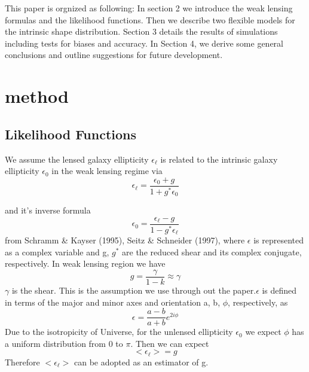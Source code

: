 \documentclass[useAMS,usenatbib]{mn2e}
\begin{document}
This paper is orgnized as following: In section 2 we introduce the
weak lensing formulas and the likelihood functions. Then we describe
two flexible models for the intrinsic shape distribution. Section 3 details
the results of simulations including tests for biases and accuracy. In Section 4, we
derive some general conclusions and outline suggestions for future
development.




\section{method}

\label{sec:XXX}


\subsection{Likelihood Functions}

We assume the lensed galaxy ellipticity $\epsilon_{\ell}$ is related
to the intrinsic galaxy ellipticity $\epsilon_{0}$ in the weak lensing
regime via 
\begin{equation}
\epsilon_{\ell}=\frac{\epsilon_{0}+g}{1+g^{*}\epsilon_{0}}
\end{equation}


and it's inverse formula 
\begin{equation}
\epsilon_{0}=\frac{\epsilon_{\ell}-g}{1-g^{*}\epsilon_{\ell}}
\end{equation}
from Schramm \& Kayser (1995), Seitz \& Schneider (1997), where $\epsilon$
is represented as a complex variable and g, $g^{*}$ are the reduced
shear and its complex conjugate, respectively. In weak lensing region we have 
\begin{equation}
g=\frac{\gamma}{1-k}\approx\gamma
\end{equation}
$\gamma$ is the shear. This is the assumption we use through out
the paper.$\epsilon$ is defined in terms of the major and minor axes and orientation a, b, $\phi$,
respectively, as
\begin{equation}
\epsilon=\frac{a-b}{a+b}e^{2i\phi}
\end{equation}
Due to the isotropicity of Universe, for the unlensed ellipticity $\epsilon_{0}$ 
we expect $\phi$ has a uniform distribution
from 0 to $\pi$. Then we can expect 
\begin{equation}
<\epsilon_{\ell}>=g
\end{equation}
Therefore $<\epsilon_{\ell}>$ can be adopted as an estimator of g.
\end{document}
